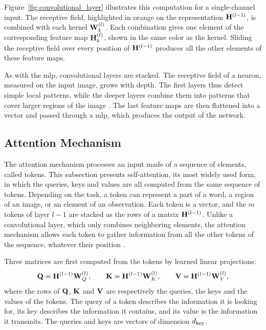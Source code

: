 Figure~\ref{fig:convolutional_layer} illustrates this computation for a single-channel input.
The receptive field, highlighted in orange on the representation $\mathbf{H}^{(l-1)}$, is combined with each kernel $\mathbf{W}^{(l)}_k$.
Each combination gives one element of the corresponding feature map $\mathbf{H}^{(l)}_k$, shown in the same color as the kernel.
Sliding the receptive field over every position of $\mathbf{H}^{(l-1)}$ produces all the other elements of these feature maps.



As with the \gls{mlp}, convolutional layers are stacked.
The receptive field of a neuron, measured on the input image, grows with depth.
The first layers thus detect simple local patterns, while the deeper layers combine them into patterns that cover larger regions of the image \parencite{goodfellow2016deep}.
The last feature maps are then flattened into a vector and passed through a \gls{mlp}, which produces the output of the network.

\subsection{Attention Mechanism}\label{subsec:deep_learning_attention_mechanism}

The attention mechanism processes an input made of a sequence of elements, called tokens.
This subsection presents self-attention, its most widely used form, in which the queries, keys and values are all computed from the same sequence of tokens.
Depending on the task, a token can represent a part of a word, a region of an image, or an element of an observation.
Each token is a vector, and the $m$ tokens of layer $l-1$ are stacked as the rows of a matrix $\mathbf{H}^{(l-1)}$.
Unlike a convolutional layer, which only combines neighboring elements, the attention mechanism allows each token to gather information from all the other tokens of the sequence, whatever their position \parencite{vaswani2017attention}.

Three matrices are first computed from the tokens by learned linear projections:
\begin{equation}
\mathbf{Q} = \mathbf{H}^{(l-1)} \mathbf{W}^{(l)}_Q, \qquad
\mathbf{K} = \mathbf{H}^{(l-1)} \mathbf{W}^{(l)}_K, \qquad
\mathbf{V} = \mathbf{H}^{(l-1)} \mathbf{W}^{(l)}_V,
\label{eq:queries_keys_values}
\end{equation}
where the rows of $\mathbf{Q}$, $\mathbf{K}$ and $\mathbf{V}$ are respectively the queries, the keys and the values of the tokens.
The query of a token describes the information it is looking for, its key describes the information it contains, and its value is the information it transmits.
The queries and keys are vectors of dimension $d_{\mathrm{key}}$.

